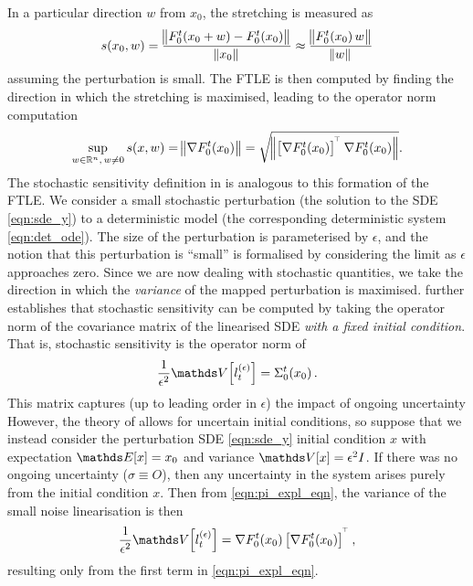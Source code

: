 In a particular direction \(w\) from \(x_0\), the stretching is measured as
\[
	s\!\left(x_0,w\right) = \frac{\norm{F_0^t\!\left(x_0 + w\right) - F_0^t\!\left(x_0\right)}}{\norm{x_0}} \approx \frac{\norm{F_0^t\!\left(x_0\right)w}}{\norm{w}}
\]
assuming the perturbation is small.
The FTLE is then computed by finding the direction in which the stretching is maximised, leading to the operator norm computation
\[
	\sup_{w \in \mathbb{R}^n, \, w \neq 0} s\!\left(x, w\right) = \norm{\nabla F_0^t\!\left(x_0\right)} = \sqrt{\norm{\left[\nabla F_0^t\!\left(x_0\right)\right]^{^{\!\top}}\nabla F_0^t\!\left(x_0\right)}}.
\]
The stochastic sensitivity definition in  is analogous to this formation of the FTLE.
We consider a small stochastic perturbation (the solution to the SDE \cref{eqn:sde_y}) to a deterministic model (the corresponding deterministic system \cref{eqn:det_ode}).
The size of the perturbation is parameterised by \(\epsilon\), and the notion that this perturbation is ``small'' is formalised by considering the limit as \(\epsilon\) approaches zero.
Since we are now dealing with stochastic quantities, we take the direction in which the \emph{variance} of the mapped perturbation is maximised.
 further establishes that stochastic sensitivity can be computed by taking the operator norm of the covariance matrix of the linearised SDE \emph{with a fixed initial condition}.
That is, stochastic sensitivity is the operator norm of
\[
	\frac{1}{\epsilon^2}\var{l_t^{(\epsilon)}} = \Sigma_0^t\!\left(x_0\right).
\]
This matrix captures (up to leading order in \(\epsilon\)) the impact of ongoing uncertainty
However, the theory of  allows for uncertain initial conditions, so suppose that we instead consider the perturbation SDE \cref{eqn:sde_y} initial condition \(x\) with expectation \(\avg{x} = x_0\) and variance \(\var{x} = \epsilon^2 I\).
If there was no ongoing uncertainty (\(\sigma \equiv O\)), then any uncertainty in the system arises purely from the initial condition \(x\).
Then from \cref{eqn:pi_expl_eqn}, the variance of the small noise linearisation is then
\[
	\frac{1}{\epsilon^2}\var{l_t^{(\epsilon)}} = \nabla F_0^t\!\left(x_0\right)\left[\nabla F_0^t\!\left(x_0\right)\right]^{\T},
\]
resulting only from the first term in \cref{eqn:pi_expl_eqn}.
